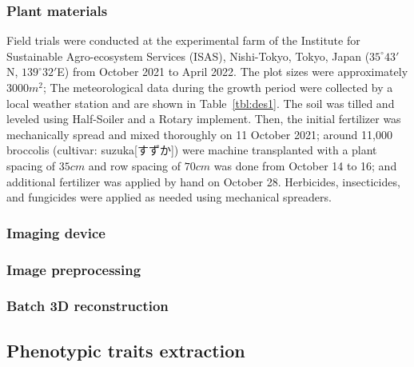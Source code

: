 \subsubsection{Plant materials}

Field trials were conducted at the experimental farm of the Institute for Sustainable Agro-ecosystem Services (ISAS), Nishi-Tokyo, Tokyo, Japan ($35^\circ 43'$N, $139^\circ 32'$E) from October 2021 to April 2022. The plot sizes were approximately $3000 m^2$; The meteorological data during the growth period were collected by a local weather station and are shown in Table~\ref{tbl:des1}. The soil was tilled and leveled using Half-Soiler and a Rotary implement. Then, the initial fertilizer was mechanically spread and mixed thoroughly on 11 October 2021; around 11,000 broccolis (cultivar: suzuka[すずか]) were machine transplanted with a plant spacing of $35 cm$ and row spacing of $70 cm$ was done from October 14 to 16; and additional fertilizer was applied by hand on October 28. Herbicides, insecticides, and fungicides were applied as needed using mechanical spreaders.






\subsubsection{Imaging device}



\subsubsection{Image preprocessing}



\subsubsection{Batch 3D reconstruction}



\subsection{Phenotypic traits extraction}



